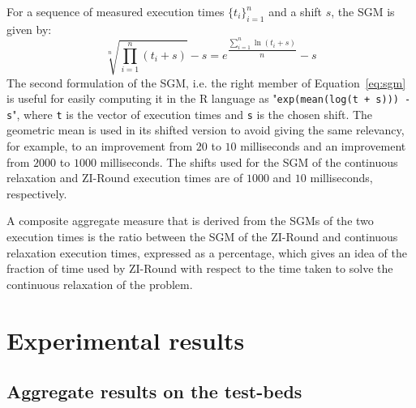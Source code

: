 \documentclass[a4paper,12pt]{book}
\begin{document}
For a sequence of measured execution times $\{t_i\}_{i=1}^{n}$ and a shift $s$, the SGM is given by:
\begin{equation}\label{eq:sgm}
	\sqrt[n]{\prod_{i=1}^{n}(t_i+s)} - s = e^{\dfrac{\sum_{i=1}^{n}\ln(t_i+s)}{n}}-s
\end{equation}
The second formulation of the SGM, i.e. the right member of Equation~\ref{eq:sgm} is useful for easily computing it in the R language as "\texttt{exp(mean(log(t + s))) - s}", where \texttt{t} is the vector of execution times and \texttt{s} is the chosen shift.
The geometric mean is used in its shifted version to avoid giving the same relevancy, for example, to an improvement from $20$ to $10$ milliseconds and an improvement from $2000$ to $1000$ milliseconds.
The shifts used for the SGM of the continuous relaxation and ZI-Round execution times are of $1000$ and $10$ milliseconds, respectively. \par 

A composite aggregate measure that is derived from the SGMs of the two execution times is the ratio between the SGM of the ZI-Round and continuous relaxation execution times, expressed as a percentage, which gives an idea of the fraction of time used by ZI-Round with respect to the time taken to solve the continuous relaxation of the problem.

\section{Experimental results} \label{sec:expresults}

\subsection{Aggregate results on the test-beds}
\end{document}
